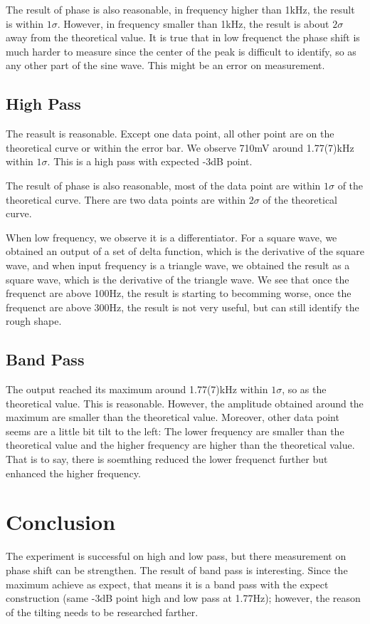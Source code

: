 \documentclass[aps,prl,reprint]{revtex4-1}
\begin{document}
        The result of phase is also reasonable, in frequency higher than 1kHz, the result is within $1\sigma$. However, in frequency smaller than 1kHz, the result is about $2\sigma$ away from the theoretical value. It is true that in low frequenct the phase shift is much harder to measure since the center of the peak is difficult to identify, so as any other part of the sine wave. This might be an error on measurement.
    \subsection{High Pass}
        The reasult is reasonable. Except one data point, all other point are on the theoretical curve or within the error bar. We observe 710mV around 1.77(7)kHz within $1\sigma$. This is a high pass with expected -3dB point.

        The result of phase is also reasonable, most of the data point are within $1\sigma$ of the theoretical curve. There are two data points are within $2\sigma$ of the theoretical curve.

        When low frequency, we observe it is a differentiator. For a square wave, we obtained an output of a set of delta function, which is the derivative of the square wave, and when input frequency is a triangle wave, we obtained the result as a square wave, which is the derivative of the triangle wave. We see that once the frequenct are above 100Hz, the result is starting to becomming worse, once the frequenct are above 300Hz, the result is not very useful, but can still identify the rough shape.

    \subsection{Band Pass}
        The output reached its maximum around 1.77(7)kHz within $1\sigma$, so as the theoretical value. This is reasonable. However, the amplitude obtained around the maximum are smaller than the theoretical value. Moreover, other data point seems are a little bit tilt to the left: The lower frequency are smaller than the theoretical value and the higher frequency are higher than the theoretical value. That is to say, there is soemthing reduced the lower frequenct further but enhanced the higher frequency.

\section{Conclusion}
    The experiment is successful on high and low pass, but there measurement on phase shift can be strengthen. The result of band pass is interesting. Since the maximum achieve as expect, that means it is a band pass with the expect construction (same -3dB point high and low pass at 1.77Hz); however, the reason of the tilting needs to be researched farther.
\end{document}
